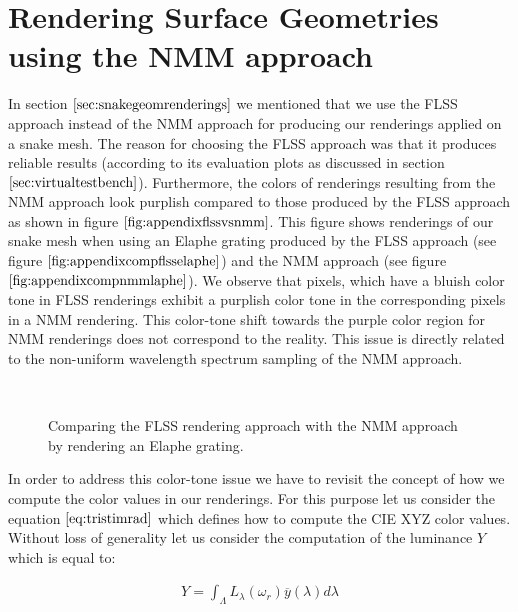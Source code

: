 \chapter{Rendering Surface Geometries using the NMM approach}
\label{chap:diffflssnmm}
In section $\ref{sec:snakegeomrenderings}$ we mentioned that we use the FLSS approach instead of the NMM approach for producing our renderings applied on a snake mesh. The reason for choosing the FLSS approach was that it produces reliable results (according to its evaluation plots as discussed in section $\ref{sec:virtualtestbench}$). Furthermore, the colors of renderings resulting from the NMM approach look purplish compared to those produced by the FLSS approach as shown in figure $\ref{fig:appendixflssvsnmm}$. This figure shows renderings of our snake mesh when using an Elaphe grating produced by the FLSS approach (see figure $\ref{fig:appendixcompflsselaphe}$) and the NMM approach (see figure $\ref{fig:appendixcompnmmlaphe}$). We observe that pixels, which have a bluish color tone in FLSS renderings exhibit a purplish color tone in the corresponding pixels in a NMM rendering. This color-tone shift towards the purple color region for NMM renderings does not correspond to the reality. This issue is directly related to the non-uniform wavelength spectrum sampling of the NMM approach. 

\begin{figure}[H]
  \centering
~
~
\caption[Comparing the NMM Approach with the FLSS Approach]{Comparing the FLSS rendering approach with the NMM approach by rendering an Elaphe grating.}
\label{fig:appendixflssvsnmm}
\end{figure}

In order to address this color-tone issue we have to revisit the concept of how we compute the color values in our renderings. For this purpose let us consider the equation $\ref{eq:tristimrad}$ which defines how to compute the CIE XYZ color values. Without loss of generality let us consider the computation of the luminance $Y$ which is equal to:

\begin{align}
Y = \int_{\Lambda}L_\lambda(\omega_r)\overline{y}(\lambda)d\lambda \nonumber
\end{align}

